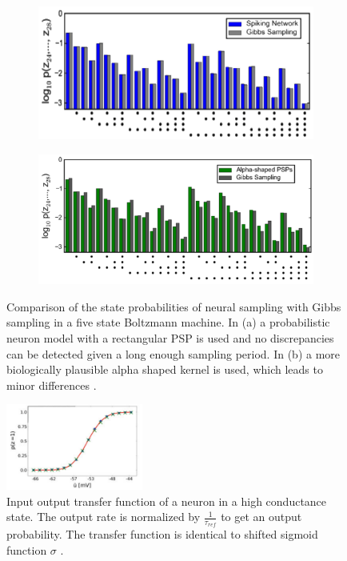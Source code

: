 \begin{figure}[h!]
	\centering
	\begin{subfigure}[t]{.50\textwidth}
  		\centering
  		\includegraphics[width=.8\linewidth]{imgs/snn_sample3.png}
  		\caption{}
  		\label{fig:sub1}
	\end{subfigure}%
	\begin{subfigure}[t]{.50\textwidth}
  		\centering
  		\includegraphics[width=.8\linewidth]{imgs/snn_sample4.png}
  		\caption{}
  		\label{fig:sub2}
	\end{subfigure}
	\caption[Comparison of the state probabilities of neural sampling with Gibbs sampling.]{Comparison of the state probabilities of neural sampling with Gibbs sampling in a five state Boltzmann machine. In (a) a probabilistic neuron model with a rectangular PSP is used and no discrepancies can be detected given a long enough sampling period. In (b) a more biologically plausible alpha shaped kernel is used, which leads to minor differences \cite{Buesing2011}.}
	\label{fig:snnsamp3}
\end{figure}


\begin{figure}
	\centering
    	\includegraphics[width=0.4\textwidth]{imgs/snn_sample5.png} 
    \caption[Input output transfer function of a neuron in a high conductance state.]{Input output transfer function of a neuron in a high conductance state. The output rate is normalized by $\frac{1}{\tau_{ref}}$ to get an output probability. The transfer function is identical to shifted sigmoid function $\sigma$  \cite{Petrovici2016}.}
	\label{fig:snnsamp4}
\end{figure}

